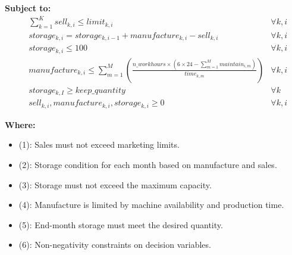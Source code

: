 \documentclass{article}
\begin{document}
\textbf{Subject to:}
\begin{align}
    & \sum_{k=1}^{K} sell_{k, i} \leq limit_{k, i} & \forall k, i \tag{1} \\
    & storage_{k, i} = storage_{k, i-1} + manufacture_{k, i} - sell_{k, i} & \forall k, i \tag{2} \\
    & storage_{k, i} \leq 100 & \forall k, i \tag{3} \\
    & manufacture_{k,i} \leq \sum_{m=1}^{M} \left( \frac{n\_workhours \times (6 \times 24 - \sum_{m=1}^{M} maintain_{i, m})}{time_{k, m}} \right) & \forall k, i \tag{4} \\
    & storage_{k, I} \geq keep\_quantity & \forall k \tag{5} \\
    & sell_{k, i}, manufacture_{k, i}, storage_{k, i} \geq 0 & \forall k, i \tag{6}
\end{align}

\textbf{Where:}
\begin{itemize}
    \item (1): Sales must not exceed marketing limits.
    \item (2): Storage condition for each month based on manufacture and sales.
    \item (3): Storage must not exceed the maximum capacity.
    \item (4): Manufacture is limited by machine availability and production time.
    \item (5): End-month storage must meet the desired quantity.
    \item (6): Non-negativity constraints on decision variables.
\end{itemize}
\end{document}
